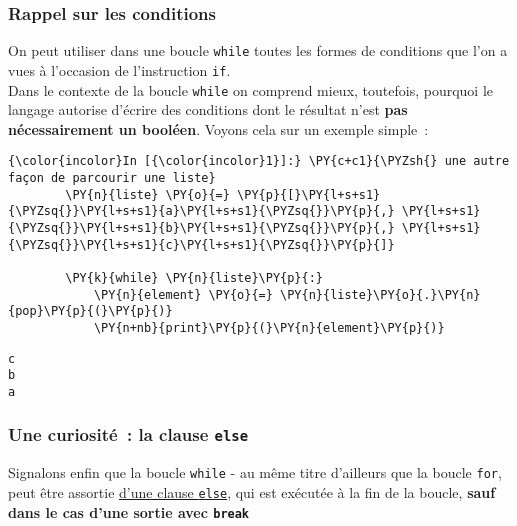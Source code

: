    \hypertarget{rappel-sur-les-conditions}{%
\subsubsection{Rappel sur les
conditions}\label{rappel-sur-les-conditions}}

    On peut utiliser dans une boucle \texttt{while} toutes les formes de
conditions que l'on a vues à l'occasion de l'instruction \texttt{if}.\\

Dans le contexte de la boucle \texttt{while} on comprend mieux,
toutefois, pourquoi le langage autorise d'écrire des conditions dont le
résultat n'est \textbf{pas nécessairement un booléen}. Voyons cela sur
un exemple simple~:

    \begin{Verbatim}[commandchars=\\\{\}]
{\color{incolor}In [{\color{incolor}1}]:} \PY{c+c1}{\PYZsh{} une autre façon de parcourir une liste}
        \PY{n}{liste} \PY{o}{=} \PY{p}{[}\PY{l+s+s1}{\PYZsq{}}\PY{l+s+s1}{a}\PY{l+s+s1}{\PYZsq{}}\PY{p}{,} \PY{l+s+s1}{\PYZsq{}}\PY{l+s+s1}{b}\PY{l+s+s1}{\PYZsq{}}\PY{p}{,} \PY{l+s+s1}{\PYZsq{}}\PY{l+s+s1}{c}\PY{l+s+s1}{\PYZsq{}}\PY{p}{]}
        
        \PY{k}{while} \PY{n}{liste}\PY{p}{:}
            \PY{n}{element} \PY{o}{=} \PY{n}{liste}\PY{o}{.}\PY{n}{pop}\PY{p}{(}\PY{p}{)}
            \PY{n+nb}{print}\PY{p}{(}\PY{n}{element}\PY{p}{)}
\end{Verbatim}


    \begin{Verbatim}[commandchars=\\\{\}]
c
b
a

    \end{Verbatim}

    \hypertarget{une-curiosituxe9-la-clause-else}{%
\subsubsection{\texorpdfstring{Une curiosité~: la clause
\texttt{else}}{Une curiosité~: la clause else}}\label{une-curiosituxe9-la-clause-else}}

    Signalons enfin que la boucle \texttt{while} - au même titre d'ailleurs
que la boucle \texttt{for}, peut être assortie
\href{https://docs.python.org/3/reference/compound_stmts.html\#the-while-statement}{d'une
clause \texttt{else}}, qui est exécutée à la fin de la boucle,
\textbf{sauf dans le cas d'une sortie avec \texttt{break}}

